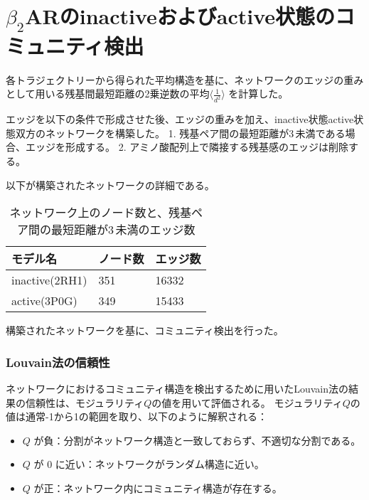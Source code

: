 \newpage


\section{$\beta_2$ARのinactiveおよびactive状態のコミュニティ検出}

各トラジェクトリーから得られた平均構造を基に、ネットワークのエッジの重みとして用いる残基間最短距離の2乗逆数の平均$\langle \frac{1}{d^2} \rangle$ を計算した。

エッジを以下の条件で形成させた後、エッジの重みを加え、inactive状態active状態双方のネットワークを構築した。
1. 残基ペア間の最短距離が3\,\text{\AA}未満である場合、エッジを形成する。
2. アミノ酸配列上で隣接する残基感のエッジは削除する。

以下が構築されたネットワークの詳細である。
\begin{table}[!ht]
    \centering
    \caption{ネットワーク上のノード数と、残基ペア間の最短距離が3\,\text{\AA}未満のエッジ数}
    \begin{tabular}{lll}
      \hline
      モデル名          & ノード数  & エッジ数 \\
      \hline 
      inactive(2RH1)  &  351 &  16332 \\ 
      active(3P0G)    &  349 &  15433 \\ 
    \end{tabular}
    \label{tab:network_size}
  \end{table}

構築されたネットワークを基に、コミュニティ検出を行った。
\subsubsection{Louvain法の信頼性}

ネットワークにおけるコミュニティ構造を検出するために用いたLouvain法の結果の信頼性は、モジュラリティ$Q$の値を用いて評価される。
モジュラリティ$Q$の値は通常-1から1の範囲を取り、以下のように解釈される：

\begin{itemize}
    \item \( Q \) が負：分割がネットワーク構造と一致しておらず、不適切な分割である。
    \item \( Q \) が 0 に近い：ネットワークがランダム構造に近い。
    \item \( Q \) が正：ネットワーク内にコミュニティ構造が存在する。
\end{itemize}

